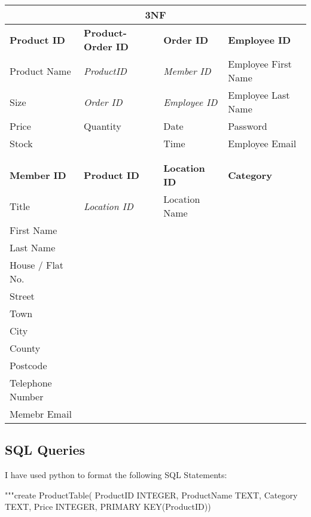 \begin{flushleft}
\begin{center}
    \begin{tabular}{|p{3cm}|p{3cm}|p{3cm}|p{2cm}|}
        \hline
	 \multicolumn{4}{|c|}{3NF} \\ \hline
	\textbf{Product ID}  & \textbf{Product-Order ID} & \textbf{Order ID} & \textbf{Employee ID} \\ \hline
	{Product Name} & \textit{ProductID} & \textit{Member ID} & {Employee First Name} \\ \hline
	{Size} & \textit{Order ID} & \textit{Employee ID} & {Employee Last Name} \\ \hline
	{Price} & {Quantity} & {Date} & {Password} \\ \hline
	{Stock} & {} & {Time} & {Employee Email} \\ \hline
	{} & {} & {} & {}\\ \hline
	{} & {} & {} & {}\\ \hline
	\textbf{Member ID} & \textbf{Product ID} & \textbf{Location ID} & \textbf{Category}\\ \hline
	{Title} & \textit{Location ID} & {Location Name} & {}\\ \hline
	{First Name} & {} & {} & {}\\ \hline
	{Last Name} & {} & {} & {}\\ \hline
	{House / Flat No.} & {} & {} & {}\\ \hline
	{Street} & {} & {} & {}\\ \hline
	{Town} & {} & {} & {}\\ \hline
	{City} & {} & {} & {}\\ \hline
	{County} & {} & {} & {}\\ \hline
	{Postcode} & {} & {} & {}\\ \hline
	{Telephone Number} & {} & {} & {}\\ \hline
	{Memebr Email} & {} & {} & {}\\ \hline
    \end{tabular}
\end{center}
\end{flushleft}

\subsection{SQL Queries}

I have used python to format the following SQL Statements:
\begin{python}
"""create ProductTable(
 ProductID INTEGER,
 ProductName TEXT,
 Category TEXT,
 Price INTEGER,
 PRIMARY KEY(ProductID))
\end{python}

